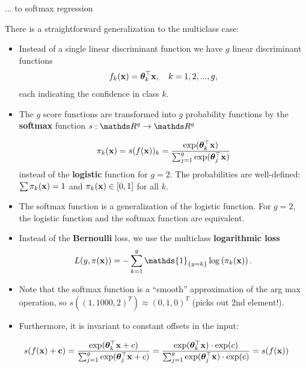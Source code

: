 \documentclass[11pt,compress,t,notes=noshow, xcolor=table]{beamer}
\begin{document}
    \begin{vbframe}{... to softmax regression}

    There is a straightforward generalization to the multiclass case:

    \begin{itemize}
      \item Instead of a single linear discriminant function we have $g$ linear discriminant functions
        $$
          f_k(\mathbf{x}) = \bm{\theta}_k^\top \mathbf{x}, \quad k = 1, 2, ..., g,
        $$
      each indicating the confidence in class $k$.
      \item The $g$ score functions are transformed into $g$ probability functions by the \textbf{softmax} function $s:\R^g \to \R^g$

      $$
        \pi_k(\mathbf{x}) = s(f(\mathbf{x}))_k = \frac{\exp(\bm{\theta}_k^\top \mathbf{x})}{\sum_{j = 1}^g \exp(\bm{\theta}_j^\top \mathbf{x}) }
      $$
      instead of the \textbf{logistic} function for $g = 2$. The probabilities are well-defined: $\sum \pi_k(\mathbf{x}) = 1$ and $\pi_k(\mathbf{x}) \in [0, 1]$ for all $k$.

      \item The softmax function is a generalization of the logistic function. For $g = 2$, the logistic function and the softmax function are equivalent.

      \item Instead of the \textbf{Bernoulli} loss, we use the multiclass \textbf{logarithmic loss}
       $$
        L(y, \pix) = - \sum_{k = 1}^g \mathds{1}_{\{y = k\}} \log\left(\pi_k(\xv)\right).
      $$
        \item Note that the softmax function is a \enquote{smooth} approximation of the arg max operation,
            so $s((1, 1000, 2)^T) \approx (0, 1, 0)^T$ (picks out 2nd element!).
        \item Furthermore, it is invariant to constant offsets in the input:
          \end{itemize}
        $$
        s(f(\mathbf{x}) + \mathbf{c}) = \frac{\exp(\bm{\theta}_k^\top \mathbf{x} + c)}{\sum_{j = 1}^g \exp(\bm{\theta}_j^\top \mathbf{x} + c)} =
        \frac{\exp(\bm{\theta}_k^\top \mathbf{x})\cdot \exp(c)}{\sum_{j = 1}^g \exp(\bm{\theta}_j^\top \mathbf{x}) \cdot \exp(c)} =
        s(f(\mathbf{x}))
        $$


    \end{vbframe}
\end{document}
